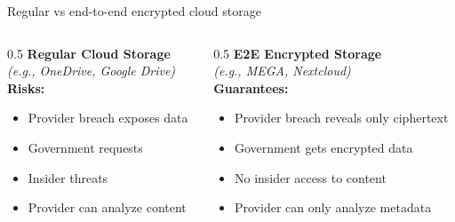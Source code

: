 \ifdefined\PRESENTATION\else\PassOptionsToClass{handout}{beamer}\fi\documentclass[aspectratio=169, lualatex]{beamer}
\begin{document}
\begin{frame}{Regular vs end-to-end encrypted cloud storage}
	\begin{columns}
		\begin{column}{0.5\textwidth}
			\textbf{Regular Cloud Storage}\\
			\textit{(e.g., OneDrive, Google Drive)}
			\\
			\vspace{0.5cm}
			\textbf{Risks:}
			\begin{itemize}[<+->]
				\item Provider breach exposes data
				\item Government requests
				\item Insider threats
				\item Provider can analyze content
			\end{itemize}
		\end{column}
		\begin{column}{0.5\textwidth}
			\textbf{E2E Encrypted Storage}\\
			\textit{(e.g., MEGA, Nextcloud)}
			\\
			\vspace{0.5cm}
			\textbf{Guarantees:}
			\begin{itemize}[<+->]
				\item Provider breach reveals only ciphertext
				\item Government gets encrypted data
				\item No insider access to content
				\item Provider can only analyze metadata
			\end{itemize}
		\end{column}
	\end{columns}
\end{frame}
\end{document}
